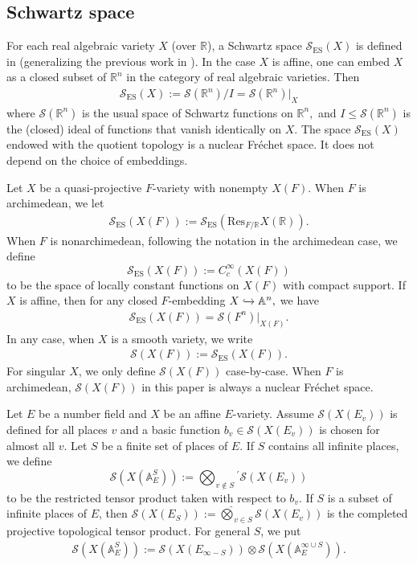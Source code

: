 \documentclass[11pt,a4paper,reqno]{amsart}
\theoremstyle{remark}
\numberwithin{equation}{section}
\newcommand{\A}{\mathbb{A}}
\newcommand{\RR}{\mathbb{R}}
\theoremstyle{definition}
\numberwithin{equation}{section}
\begin{document}
\subsection{Schwartz space}\label{ssec:Schwartz}

For each real algebraic variety $X$ (over $\RR$), a Schwartz space $\mathcal{S}_{\mathrm{ES}}(X)$ is defined in \cite[Definition 3.7]{Elazar:Shaviv} (generalizing the previous work in \cite{AG:Nash}). In the case $X$ is affine, one can embed $X$ as a closed subset of $\RR^n$ in the category of real algebraic varieties. Then
\begin{align*}
    \mathcal{S}_{\mathrm{ES}}(X):= \mathcal{S}(\RR^n)/I=\mathcal{S}(\RR^n)|_{X}
\end{align*}
where $\mathcal{S}(\RR^n)$ is the usual space of Schwartz functions on $\RR^n,$ and $I \le \mathcal{S}(\RR^n)$ is the (closed) ideal of functions that vanish identically on $X$. The space $\mathcal{S}_{\mathrm{ES}}(X)$ endowed with the quotient topology is a nuclear Fr\'echet space. It does not depend on the choice of embeddings. 

Let $X$ be a quasi-projective $F$-variety with nonempty $X(F)$. When $F$ is archimedean, we let
\begin{align*}
    \mathcal{S}_{\mathrm{ES}}(X(F)):=\mathcal{S}_{\mathrm{ES}}(\mathrm{Res}_{F/\RR}X(\RR)).
\end{align*}
When $F$ is nonarchimedean, following the notation in the archimedean case, we define 
$$\mathcal{S}_{\mathrm{ES}}(X(F)):=C^\infty_c(X(F))$$ to be the space of locally constant functions on $X(F)$ with compact support. If $X$ is affine, then for any closed $F$-embedding $X\lhook\joinrel\xrightarrow{\,\,} \mathbb{A}^n,$ we have
\begin{align*}
    \mathcal{S}_{\mathrm{ES}}(X(F))=\mathcal{S}(F^n)\big|_{X(F)}.
\end{align*}
In any case, when $X$ is a smooth variety, we write
\begin{align*}
    \mathcal{S}(X(F)):=\mathcal{S}_{\mathrm{ES}}(X(F)).
\end{align*}
For singular $X$, we only define $\mathcal{S}(X(F))$ case-by-case. When $F$ is archimedean, $\mathcal{S}(X(F))$ in this paper is always a nuclear Fr\'echet space.


Let $E$ be a number field and $X$ be an affine $E$-variety. Assume $\mathcal{S}(X(E_v))$ is defined for all places $v$ and a basic function $b_v \in \mathcal{S}(X(E_v))$
is chosen for almost all $v$. Let $S$ be a finite set of places of $E$. If $S$ contains all infinite places, we define $$\mathcal{S}(X(\A_{E}^S)):=\bigotimes_{v\not\in S}{}^{\prime}
\mathcal{S}(X(E_v))$$ to be the restricted
tensor product taken with respect to $b_v$. If $S$ is a subset of infinite places of $E$, then
$\mathcal{S}(X(E_S)) := \widehat{\bigotimes}_{v\in S}\mathcal{S}(X(E_v))$ is the completed projective topological tensor product. For
general $S$, we put
\begin{align*}
\mathcal{S}(X(\A_E^S
)) := \mathcal{S}(X(E_{\infty-S}))\otimes \mathcal{S}(X(\A_E^{\infty\cup S}
)).
\end{align*}
\end{document}
